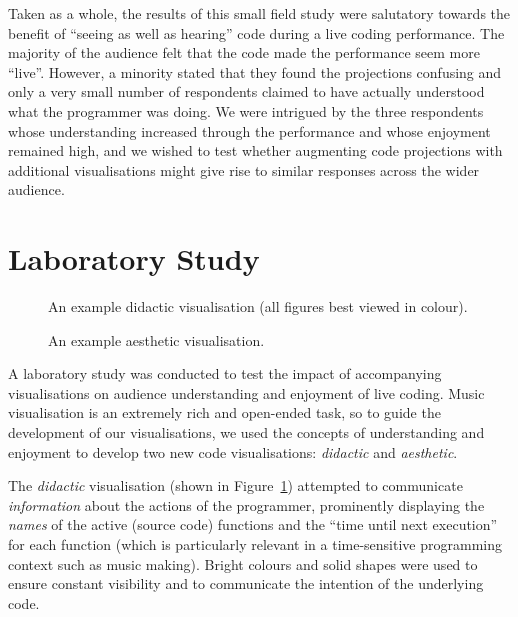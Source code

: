 \documentclass{sig-alternate}
\begin{document}
Taken as a whole, the results of this small field study were
salutatory towards the benefit of ``seeing as well as hearing'' code
during a live coding performance. The majority of the audience felt
that the code made the performance seem more ``live''. However, a
minority stated that they found the projections confusing and only a
very small number of respondents claimed to have actually understood
what the programmer was doing. We were intrigued by the three
respondents whose understanding increased through the performance and
whose enjoyment remained high, and we wished to test whether
augmenting code projections with additional visualisations might give
rise to similar responses across the wider audience.

\section{Laboratory Study}

\begin{figure}
\centering
{}
\caption{An example didactic visualisation (all
  figures best viewed in colour).}
\label{fig:didactic-visualisation}
\end{figure}

\begin{figure}
\centering
{}
\caption{An example aesthetic visualisation.}
\label{fig:aesthetic-visualisation}
\end{figure}

A laboratory study was conducted to test the impact of accompanying
visualisations on audience understanding and enjoyment of live coding.
Music visualisation is an extremely rich and open-ended task, so to
guide the development of our visualisations, we used the concepts of
understanding and enjoyment to develop two new code visualisations:
\emph{didactic} and \emph{aesthetic}.

The \emph{didactic} visualisation (shown in
Figure~\ref{fig:didactic-visualisation}) attempted to communicate
\emph{information} about the actions of the programmer, prominently
displaying the \emph{names} of the active (source code) functions and
the ``time until next execution'' for each function (which is
particularly relevant in a time-sensitive programming context such as
music making). Bright colours and solid shapes were used to ensure
constant visibility and to communicate the intention of the underlying
code.
\end{document}

